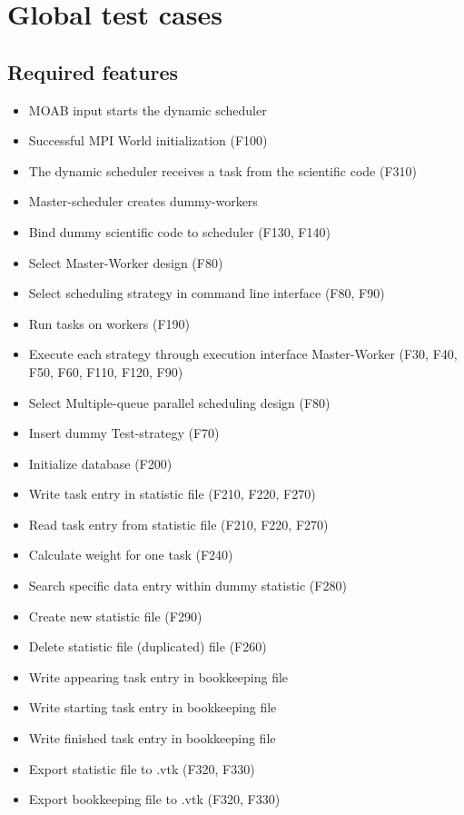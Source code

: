 {
\setcounter{funcGTC}{10}
\renewcommand{\labelitemi}{
	\ifnum \value{funcGTC}<10$/T 0\arabic{funcGTC} /$\addtocounter{funcGTC}{10}
	\else $/T \arabic{funcGTC} /$\addtocounter{funcGTC}{10}\fi
}

\section{Global test cases}
	\subsection{Required features}		
		\begin{itemize}
			\item MOAB input starts the dynamic scheduler
			\item Successful MPI World initialization (F100)
			
			\item The dynamic scheduler receives a task from the scientific code (F310)
			\item Master-scheduler creates dummy-workers
			\item Bind dummy scientific code to scheduler (F130, F140)
			
			\item Select Master-Worker design (F80)
			\item Select scheduling strategy in command line interface (F80, F90)
			\item Run tasks on workers (F190)
			\item Execute each strategy through execution interface Master-Worker (F30, F40, F50, F60, 							F110, F120, F90)	
			\item Select Multiple-queue parallel scheduling design (F80)
			\item Insert dummy Test-strategy (F70)
			
			\item Initialize database (F200)
			\item Write task entry in statistic file (F210, F220, F270)
			\item Read task entry from statistic file (F210, F220, F270)
			\item Calculate weight for one task (F240)
			\item Search specific data entry within dummy statistic (F280)
			\item Create new statistic file (F290)
			\item Delete statistic file (duplicated) file (F260)
			\item Write appearing task entry in bookkeeping file
			\item Write starting task entry in bookkeeping file
			\item Write finished task entry in bookkeeping file
			\item Export statistic file to .vtk (F320, F330)
			\item Export bookkeeping file to .vtk (F320, F330)
		\end{itemize}
		
}
